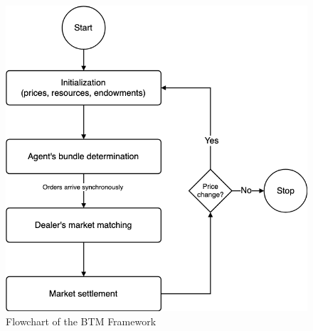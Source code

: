 \begin{figure}[htbp]
	\centering
	\includegraphics[width=.4\linewidth]{./figures/btm_flowchart.png}
	\caption{Flowchart of the BTM Framework}
	\label{figure:btm_flowchart}
\end{figure}

